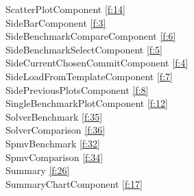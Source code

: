 ScatterPlotComponent \ref{f:14} \\
SideBarComponent \ref{f:3} \\
SideBenchmarkCompareComponent \ref{f:6} \\
SideBenchmarkSelectComponent \ref{f:5} \\
SideCurrentChosenCommitComponent \ref{f:4} \\
SideLoadFromTemplateComponent \ref{f:7} \\
SidePreviousPlotsComponent \ref{f:8} \\
SingleBenchmarkPlotComponent \ref{f:12} \\
SolverBenchmark  \ref{f:35} \\
SolverComparison  \ref{f:36} \\
SpmvBenchmark  \ref{f:32} \\
SpmvComparison  \ref{f:34} \\
Summary \ref{f:26} \\
SummaryChartComponent \ref{f:17} \\
